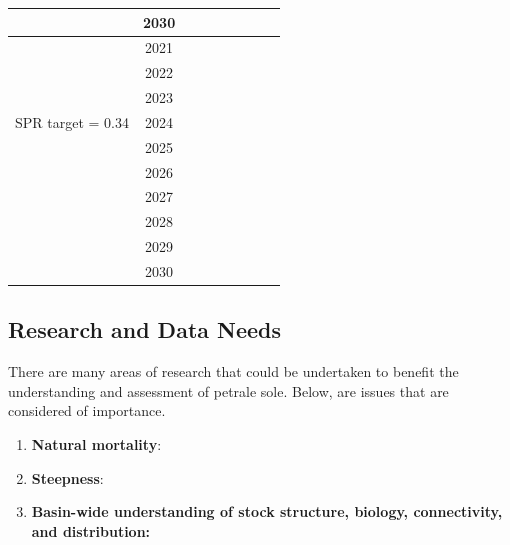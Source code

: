 \documentclass[12pt,]{article}
\begin{document}
\begin{table}[ht]
{\begin{tabular}{l|cc|>{\centering}p{.7in}c|>{\centering}p{.7in}c|>{\centering}p{.7in}c}
   & 2030 &  &  &  &  &  &  &  \\ 
   \hline
 & 2021 &  &  &  &  &  &  &  \\ 
   & 2022 &  &  &  &  &  &  &  \\ 
   & 2023 &  &  &  &  &  &  &  \\ 
  SPR target = 0.34 & 2024 &  &  &  &  &  &  &  \\ 
   & 2025 &  &  &  &  &  &  &  \\ 
   & 2026 &  &  &  &  &  &  &  \\ 
   & 2027 &  &  &  &  &  &  &  \\ 
   & 2028 &  &  &  &  &  &  &  \\ 
   & 2029 &  &  &  &  &  &  &  \\ 
   & 2030 &  &  &  &  &  &  &  \\ 
   \hline
\end{tabular}
}
\end{table}

\FloatBarrier

\subsection*{Research and Data Needs}\label{research-and-data-needs}

There are many areas of research that could be undertaken to benefit the
understanding and assessment of petrale sole. Below, are issues that are
considered of importance.

\begin{enumerate}

\item \textbf{Natural mortality}: 

\item \textbf{Steepness}: 

\item \textbf{Basin-wide understanding of stock structure, biology, connectivity, and distribution:} 

\end{enumerate}
\end{document}
